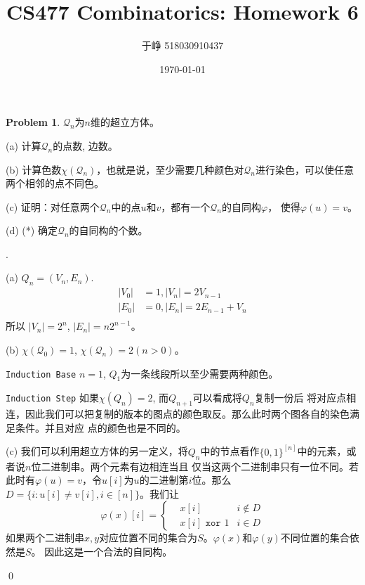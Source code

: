 \documentclass[UTF8]{ctexart}
\newenvironment{sol}
  {\par\vspace{3mm}\indent{\it Solution}.
  \setlength{\parindent}{2em}}
  {\qed \\ \medskip}
\theoremstyle{definition}
\newtheorem{problem}{Problem}
\begin{document}
\title{CS477 Combinatorics: Homework 6}
\author{于峥 518030910437}
\date{\today}

\maketitle

\begin{problem}    
$\mathcal{Q}_n$为$n$维的超立方体。

(a) 计算$\mathcal{Q}_n$的点数, 边数。

(b) 计算色数$\chi(\mathcal{Q}_n)$，也就是说，至少需要几种颜色对$\mathcal{Q}_n$进行染色，可以使任意两个相邻的点不同色。

(c) 证明：对任意两个$\mathcal{Q}_n$中的点$u$和$v$，都有一个$\mathcal{Q}_n$的自同构$\varphi$，
使得$\varphi(u) = v$。

(d) (*) 确定$\mathcal{Q}_n$的自同构的个数。
\begin{sol}
    
    \noindent(a) $Q_n = (V_n, E_n)$.
    \begin{align*}
        |V_0| &= 1 , |V_n| = 2V_{n-1} \\
        |E_0| &= 0 , |E_n| = 2E_{n-1} + V_n \\        
    \end{align*}
    所以 $|V_n|=2^n$, $|E_n|=n2^{n-1}$。

    \noindent(b) $\chi(\mathcal{Q}_0)=1$, $\chi(\mathcal{Q}_n)=2(n>0)$。
    
    \texttt{Induction Base} $n=1$, $Q_1$为一条线段所以至少需要两种颜色。
    
    \texttt{Induction Step} 如果$\chi(Q_n)=2$, 而$Q_{n+1}$可以看成将$Q_n$复制一份后
    将对应点相连，因此我们可以把复制的版本的图点的颜色取反。那么此时两个图各自的染色满足条件。并且对应
    点的颜色也是不同的。

    \noindent(c) 我们可以利用超立方体的另一定义，将$Q_n$中的节点看作$\{0,1\}^{[n]}$中的元素，或者说$n$位二进制串。两个元素有边相连当且
    仅当这两个二进制串只有一位不同。若此时有$\varphi(u)=v$，令$u[i]$为$u$的二进制第$i$位。那么
    $D =\{ i : u[i] \not= v[i], i \in [n] \}$。我们让
    \begin{equation*}
        \varphi(x)[i] = \left\{
            \begin{aligned}
                & x[i] & i \not\in D \\
                & x[i] \texttt{ xor } 1 & i \in D
            \end{aligned}
        \right.
    \end{equation*}
    如果两个二进制串$x,y$对应位置不同的集合为$S$。$\varphi(x)$和$\varphi(y)$不同位置的集合依然是$S$。
    因此这是一个合法的自同构。
    

\end{sol}
\end{problem}
\end{document}

